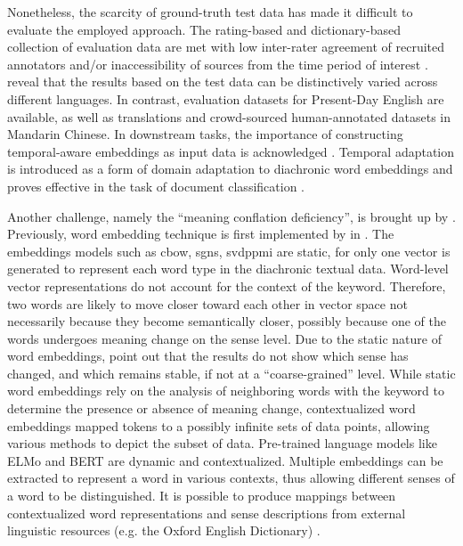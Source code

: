Nonetheless, the scarcity of ground-truth test data has made it difficult to evaluate the employed approach. The rating-based and dictionary-based collection of evaluation data are met with low inter-rater agreement of recruited annotators and/or inaccessibility of sources from the time period of interest \parencite{tang2018state}. \textcite{kutuzov2020uio} reveal that the results based on the test data can be distinctively varied across different languages. In contrast, evaluation datasets for Present-Day English are available, as well as translations and crowd-sourced human-annotated datasets in Mandarin Chinese. In downstream tasks, the importance of constructing temporal-aware embeddings as input data is acknowledged \parencite{huang2019neural}. Temporal adaptation is introduced as a form of domain adaptation to diachronic word embeddings and proves effective in the task of document classification \parencite{huang2019neural}.%

Another challenge, namely the ``meaning conflation deficiency'', is brought up by \textcite{camacho2018survey}. Previously, word embedding technique is first implemented by \citeauthor{mikolov2013efficient} in \cite*{mikolov2013efficient}. The embeddings models such as \gls{cbow}, \gls{sgns}, \gls{svdppmi} are static, for only one vector is generated to represent each word type in the diachronic textual data. Word-level vector representations do not account for the context of the keyword. Therefore, two words are likely to move closer toward each other in vector space not necessarily because they become semantically closer, possibly because one of the words undergoes meaning change on the sense level. Due to the static nature of word embeddings, \textcite{hu2019diachronic} point out that the results do not show which sense has changed, and which remains stable, if not at a ``coarse-grained'' level. While static word embeddings rely on the analysis of neighboring words with the keyword to determine the presence or absence of meaning change, contextualized word embeddings mapped tokens to a possibly infinite sets of data points, allowing various methods to depict the subset of data. Pre-trained language models like ELMo and BERT are dynamic and contextualized. Multiple embeddings can be extracted to represent a word in various contexts, thus allowing different senses of a word to be distinguished. It is possible to produce mappings between contextualized word representations and sense descriptions from external linguistic resources (e.g. the Oxford English Dictionary) \parencite{hu2019diachronic}.

